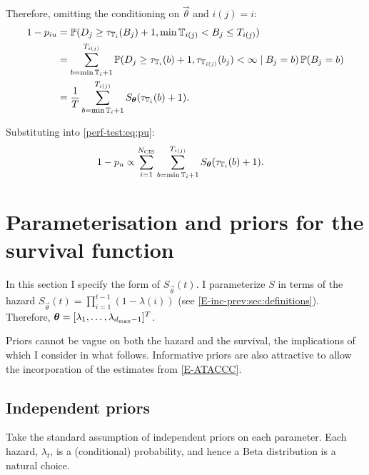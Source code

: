 \documentclass[thesis.tex]{subfiles}
\begin{document}
Therefore, omitting the conditioning on $\vec{\theta}$ and $i(j) = i$:
\begin{align}
1 - p_{iu}
&= \operatorname{\mathbb{P}}(D_j \geq \tau_{\mathbb{T}_{i}}(B_j)+ 1, \min \mathbb{T}_{i(j)} < B_j \leq T_{i(j)}) \\
&= \sum_{b = \min \mathbb{T}_{i} + 1}^{T_{i(j)}} \operatorname{\mathbb{P}}(D_j \geq \tau_{\mathbb{T}_{i}}(b) + 1, \tau_{\mathbb{T}_{i(j)}}(b_j) < \infty \mid B_j = b) \operatorname{\mathbb{P}}(B_j = b)\\
&= \frac{1}{T} \sum_{b = \min \mathbb{T}_{i} + 1}^{T_{i(j)}} S_{\bm{\theta}}(\tau_{\mathbb{T}_{i}}(b) + 1).
\label{perf-test:eq:piu}
\end{align}

Substituting into \cref{perf-test:eq:pu}:
\begin{align}
1 - p_u
& \propto \sum_{i=1}^{N_\text{CIS}} \sum_{b = \min \mathbb{T}_{i} + 1}^{T_{i(j)}} S_{\bm{\theta}}(\tau_{\mathbb{T}_{i}}(b) + 1).
\end{align}

\section{Parameterisation and priors for the survival function} \label{perf-test:sec:parameters-priors}

In this section I specify the form of $S_{\vec{\theta}}(t)$.
I parameterize $S$ in terms of the hazard $S_{\vec{\theta}}(t) = \prod_{i=1}^{t-1} (1 - \lambda(i))$ (see \cref{E-inc-prev:sec:definitions}).
Therefore, $\bm{\theta} = [\lambda_1, \dots, \lambda_{d_\text{max}-1}]^T$.

Priors cannot be vague on both the hazard and the survival, the implications of which I consider in what follows.
Informative priors are also attractive to allow the incorporation of the estimates from \cref{E-ATACCC}.

\subsection{Independent priors} \label{perf-test:sec:independent-priors}
Take the standard assumption of independent priors on each parameter.
Each hazard, $\lambda_t$, is a (conditional) probability, and hence a Beta distribution is a natural choice.
\end{document}

